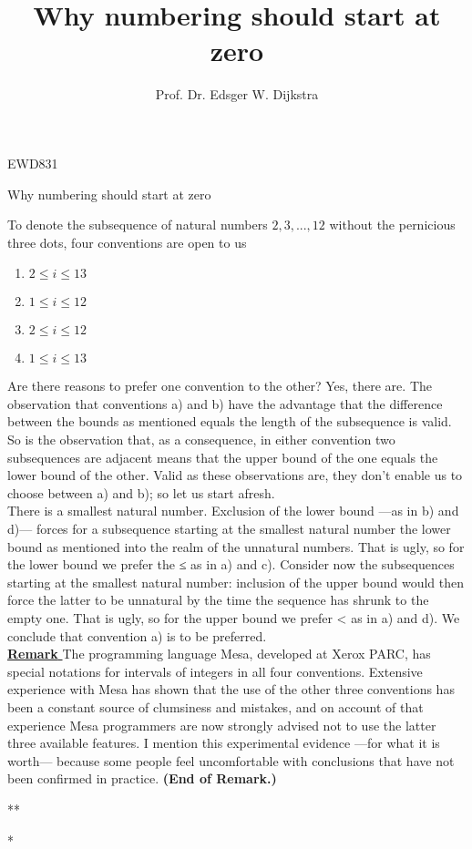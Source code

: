 \documentclass[]{article}
\title{Why numbering should start at zero}
\author{Prof. Dr. Edsger W. Dijkstra}
\date{}
\begin{document}
\maketitle


\begin{flushright}
	EWD831
\end{flushright}

Why numbering should start at zero

To denote the subsequence of natural numbers $2, 3, ... ,12$ without the pernicious three dots, four conventions are open to us

\noindent 

\begin{enumerate}[label=\alph*]
\item $2 \leq i \le 13$
\item $1 \le i \leq 12$
\item $2 \leq i \leq 12$
\item $1 \le i \le 13$
\end{enumerate}


Are there reasons to prefer one convention to the other? Yes, there are. The observation that conventions a) and b) have the advantage that the difference between the bounds as mentioned equals the length of the subsequence is valid. So is the observation that, as a consequence, in either convention two subsequences are adjacent means that the upper bound of the one equals the lower bound of the other. Valid as these observations are, they don't enable us to choose between a) and b); so let us start afresh.\\

There is a smallest natural number. Exclusion of the lower bound —as in b) and d)— forces for a subsequence starting at the smallest natural number the lower bound as mentioned into the realm of the unnatural numbers. That is ugly, so for the lower bound we prefer the ≤ as in a) and c). Consider now the subsequences starting at the smallest natural number: inclusion of the upper bound would then force the latter to be unnatural by the time the sequence has shrunk to the empty one. That is ugly, so for the upper bound we prefer < as in a) and d). We conclude that convention a) is to be preferred.\\

\underline{\textbf{Remark} } The programming language Mesa, developed at Xerox PARC, has special notations for intervals of integers in all four conventions. Extensive experience with Mesa has shown that the use of the other three conventions has been a constant source of clumsiness and mistakes, and on account of that experience Mesa programmers are now strongly advised not to use the latter three available features. I mention this experimental evidence —for what it is worth— because some people feel uncomfortable with conclusions that have not been confirmed in practice.\textbf{ (End of Remark.)}\\
\begin{center} {\centering
*\hspace*{3.5cm}*\par
*
}
\end{center}
\end{document}
